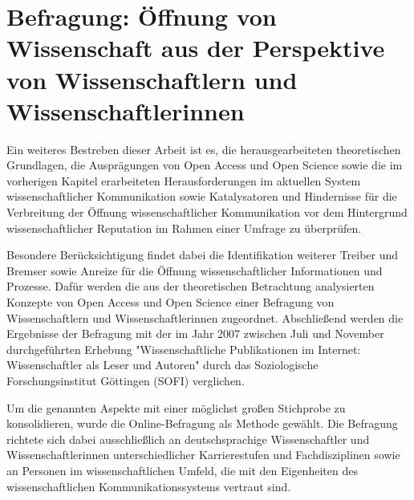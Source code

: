 \chapter{Befragung: Öffnung von Wissenschaft aus der Perspektive von Wissenschaftlern und Wissenschaftlerinnen}

Ein weiteres Bestreben dieser Arbeit ist es, die herausgearbeiteten theoretischen Grundlagen, die Ausprägungen von Open Access und Open Science sowie die im vorherigen Kapitel erarbeiteten Herausforderungen im aktuellen System wissenschaftlicher Kommunikation sowie Katalysatoren und Hindernisse für die Verbreitung der Öffnung wissenschaftlicher Kommunikation vor dem Hintergrund wissenschaftlicher Reputation im Rahmen einer Umfrage zu überprüfen.

Besondere Berücksichtigung findet dabei die Identifikation weiterer Treiber und Bremser sowie Anreize für die Öffnung wissenschaftlicher Informationen und Prozesse. Dafür werden die aus der theoretischen Betrachtung analysierten Konzepte von Open Access und Open Science einer Befragung von Wissenschaftlern und Wissenschaftlerinnen zugeordnet. Abschließend werden die Ergebnisse der Befragung mit der im Jahr 2007 zwischen Juli und November durchgeführten Erhebung "Wissenschaftliche Publikationen im Internet: Wissenschaftler als Leser und Autoren" durch das Soziologische Forschungsinstitut Göttingen (SOFI) \cite{Hanekop_2008} verglichen.

Um die genannten Aspekte mit einer möglichst großen Stichprobe zu konsolidieren, wurde die Online-Befragung als Methode gewählt. Die Befragung richtete sich dabei ausschließlich an deutschsprachige Wissenschaftler und Wissenschaftlerinnen unterschiedlicher Karrierestufen und Fachdisziplinen sowie an Personen im wissenschaftlichen Umfeld, die mit den Eigenheiten des wissenschaftlichen Kommunikationssystems vertraut sind.

